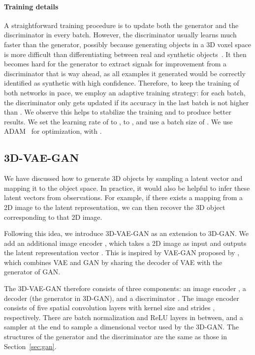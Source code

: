 \documentclass{article}
\newcommand{\sect}[1]{Section~\ref{#1}}
\newcommand{\model}{3D-GAN\xspace}
\newcommand{\vaemodel}{3D-VAE-GAN\xspace}
\newcommand{\myparagraph}[1]{\vspace{-10pt}\paragraph{#1}}
\newcommand{\presubsection}{\vspace{-8pt}}
\newcommand{\postsubsection}{\vspace{-6pt}}
\begin{document}
\myparagraph{Training details} A straightforward training procedure is to update both the generator and the discriminator in every batch. 
However, the discriminator usually learns much faster than the generator, possibly because generating objects in a 3D voxel space is more difficult than differentiating between real and synthetic objects~\citep{goodfellow2014generative,radford2016unsupervised}.  It then becomes hard for the generator to extract signals for improvement from a discriminator that is way ahead, as all examples it generated would be correctly identified as synthetic with high confidence.
Therefore, to keep the training of both networks in pace, we employ an adaptive training strategy: for each batch, the discriminator only gets updated if its accuracy in the last batch is not higher than . We observe this helps to stabilize the training and to produce better results. We set the learning rate of  to ,  to , and use a batch size of . We use ADAM~\citep{kingma2014adam} for optimization, with .

\presubsection
\subsection{\vaemodel}
\label{sec:vaegan}
\postsubsection


We have discussed how to generate 3D objects by sampling a latent vector  and mapping it to the object space. In practice, it would also be helpful to infer these latent vectors from observations. For example, if there exists a mapping from a 2D image to the latent representation, we can then recover the 3D object corresponding to that 2D image.

Following this idea, we introduce \vaemodel as an extension to \model.
We add an additional image encoder , which takes a 2D image  as input and outputs the latent representation vector . This is inspired by VAE-GAN proposed by \citep{larsen2015autoencoding}, which combines VAE and GAN by sharing the decoder of VAE with the generator of GAN. 

The \vaemodel therefore consists of three components: an image encoder , a decoder (the generator  in \model), and a discriminator . The image encoder consists of five spatial convolution layers with kernel size  and strides , respectively. There are batch normalization and ReLU layers in between, and a sampler at the end to sample a  dimensional vector used by the \model. The structures of the generator and the discriminator are the same as those in \sect{sec:gan}.
\end{document}
